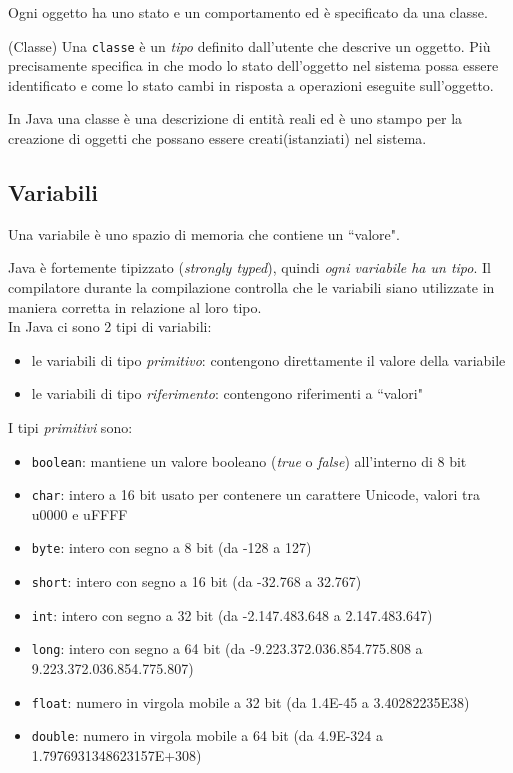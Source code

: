 \documentclass{article}
\begin{document}
Ogni oggetto ha uno stato e un comportamento ed è specificato da una classe.

\begin{mydef} (Classe) Una \texttt{classe} è un \emph{tipo} 
definito dall'utente che descrive un oggetto.
Più precisamente specifica in che modo lo stato dell'oggetto nel sistema possa essere identificato e come lo stato cambi in risposta a operazioni eseguite sull'oggetto.
\end{mydef}
In Java una classe è una descrizione di entità reali ed è uno stampo per la creazione di oggetti che possano essere creati(istanziati) nel sistema.

\subsection{Variabili}
\begin{mydef} Una variabile è uno spazio di memoria che contiene un ``valore". 
\end{mydef}
Java è fortemente tipizzato (\emph{strongly typed}), quindi \emph{ogni variabile ha un tipo}. Il compilatore durante la compilazione controlla che le variabili siano utilizzate in maniera corretta in relazione al loro tipo.\\

In Java ci sono 2 tipi di variabili:
\begin{itemize}
\item le variabili di tipo \emph{primitivo}: contengono direttamente il valore della variabile
\item le variabili di tipo \emph{riferimento}: contengono riferimenti a ``valori" 
\end{itemize}

I tipi \emph{primitivi} sono:

	\begin{itemize}
		\item \texttt{boolean}: mantiene un valore booleano (\emph{true} o \emph{false}) all'interno di 8 bit
		\item \texttt{char}: intero a 16 bit usato per contenere un carattere Unicode, valori tra u0000 e uFFFF
		\item \texttt{byte}: intero con segno a 8 bit (da -128 a 127)
		\item \texttt{short}: intero con segno a 16 bit (da -32.768 a 32.767)
		\item \texttt{int}: intero con segno a 32 bit (da -2.147.483.648 a 2.147.483.647)
		\item \texttt{long}: intero con segno a 64 bit (da -9.223.372.036.854.775.808 a 9.223.372.036.854.775.807)
		\item \texttt{float}: numero in virgola mobile a 32 bit (da 1.4E-45 a 3.40282235E38)
		\item \texttt{double}: numero in virgola mobile a 64 bit (da 4.9E-324 a 1.7976931348623157E+308)
	\end{itemize}
\end{document}
